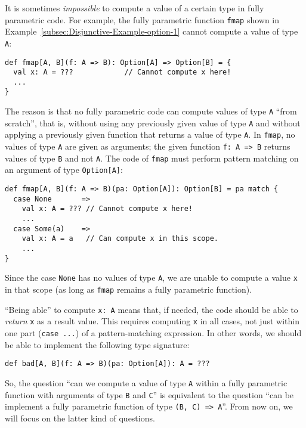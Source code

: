 It is sometimes \emph{impossible} to compute a value of a certain
type in fully parametric code. For example, the fully parametric function
\lstinline!fmap! shown in Example~\ref{subsec:Disjunctive-Example-option-1}
cannot compute a value of type \lstinline!A!:
\begin{lstlisting}
def fmap[A, B](f: A => B): Option[A] => Option[B] = {
  val x: A = ???            // Cannot compute x here!
  ...
}
\end{lstlisting}
The reason is that no fully parametric code can compute values of
type \lstinline!A! \textsf{``}from scratch\textsf{''}, that is, without using any
previously given value of type \lstinline!A! and without applying
a previously given function that returns a value of type \lstinline!A!.
In \lstinline!fmap!, no values of type \lstinline!A! are given as
arguments; the given function \lstinline!f: A => B! returns values
of type \lstinline!B! and not \lstinline!A!. The code of \lstinline!fmap!
must perform pattern matching on an argument of type \lstinline!Option[A]!:
\begin{lstlisting}
def fmap[A, B](f: A => B)(pa: Option[A]): Option[B] = pa match {
  case None       => 
    val x: A = ??? // Cannot compute x here!
    ...
  case Some(a)    =>
    val x: A = a   // Can compute x in this scope.
    ...
}
\end{lstlisting}
Since the case \lstinline!None! has no values of type \lstinline!A!,
we are unable to compute a value \lstinline!x! in that scope (as
long as \lstinline!fmap! remains a fully parametric function). 

\textsf{``}Being able\textsf{''} to compute \lstinline!x: A! means that, if needed,
the code should be able to \emph{return} \lstinline!x! as a result
value. This requires computing \lstinline!x! in all cases, not just
within one part (\lstinline!case ...!) of a pattern-matching expression.
In other words, we should be able to implement the following type
signature:
\begin{lstlisting}
def bad[A, B](f: A => B)(pa: Option[A]): A = ???
\end{lstlisting}

So, the question \textsf{``}can we compute a value of type \lstinline!A!
within a fully parametric function with arguments of type \lstinline!B!
and \lstinline!C!\textsf{''} is equivalent to the question \textsf{``}can be implement
a fully parametric function of type \lstinline!(B, C) => A!\textsf{''}. From
now on, we will focus on the latter kind of questions.

